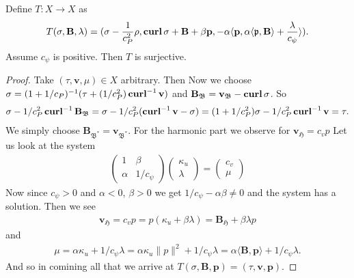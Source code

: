\documentclass[../master_thesis.tex]{subfiles}
\begin{document}
\begin{lemma}
    Define $T:X \rightarrow X$ as 
    \begin{align*}
        T(\sigma, \mathbf{B},\lambda)
        = (\sigma - \frac{1}{c_P^2}\rho, \veccurl \sigma + \mathbf{B} + \beta \mathbf{p},
            -\alpha \langle \mathbf{p}, \alpha \langle \mathfrak{p}, \mathbf{B} \rangle  
            + \frac{\lambda}{c_\psi} \rangle).
    \end{align*}
    Assume $c_\psi$ is positive.
    Then $T$ is surjective. 
\end{lemma}
\begin{proof}
    Take $(\tau, \mathbf{v},\mu) \in X$ arbitrary. Then 
    Now we choose $\sigma = (1+1/c_P)^{-1} (\tau + (1/c_P^2) \veccurl^{-1} \mathbf{v})$ 
    and $\mathbf{B}_\mathfrak{B} = \mathbf{v}_\mathfrak{B} - \veccurl \sigma$. 
    So 
    \begin{align*}
        \sigma -  1/c_P^2 \veccurl^{-1}\mathbf{B}_\mathfrak{B} 
        = \sigma -  1/c_P^2 (\veccurl^{-1} \mathbf{v} - \sigma)
        = (1+1/c_P^2)\sigma - 1/c_P^2 \veccurl^{-1} \mathbf{v}
        = \tau.
    \end{align*}
    We simply choose $\mathbf{B}_\mathfrak{B^*} = \mathbf{v}_\mathfrak{B^*}$.
    For the harmonic part we observe for $\mathbf{v}_\mathfrak{H} = c_v p$
    Let us look at the system 
    \begin{align*}
        \begin{pmatrix}
            1 & \beta 
            \\ \alpha & 1/c_\psi
        \end{pmatrix}
        \begin{pmatrix}
            \kappa_u 
            \\ \lambda 
        \end{pmatrix}
        = 
        \begin{pmatrix}
            c_v 
            \\ \mu
        \end{pmatrix}
    \end{align*}
    Now since $c_\psi > 0$ and $\alpha < 0$, $\beta > 0$ we get 
    $1/c_\psi - \alpha \beta \neq 0$ and the system has a solution. 
    Then we see 
    \begin{align*}
        \mathbf{v}_\mathfrak{H} = c_v p = p(\kappa_u + \beta \lambda) 
        =  \mathbf{B}_\mathfrak{H} + \beta \lambda p
    \end{align*}
    and 
    \begin{align*}
        \mu = \alpha \kappa_u + 1/c_\psi \lambda
        = \alpha \kappa_u \lVert p \rVert^2 + 1/c_\psi \lambda 
        = \alpha \langle \mathbf{B}, \mathbf{p} \rangle + 1/c_\psi \lambda.
    \end{align*}
    And so in comining all that we arrive at 
    $T(\sigma,\mathbf{B}, \mathbf{p}) = (\tau, \mathbf{v}, \mathbf{p})$.
\end{proof}
\end{document}
